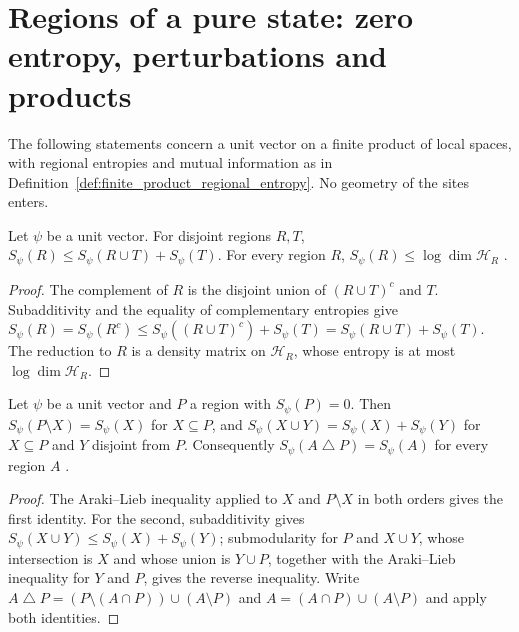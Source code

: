 \section{Regions of a pure state: zero entropy, perturbations and products}

The following statements concern a unit vector on a finite product of local
spaces, with regional entropies and mutual information as in
Definition~\ref{def:finite_product_regional_entropy}. No geometry of the sites
enters.

\begin{theorem}
    \label{thm:finite_product_araki_lieb}
    \leanok
    Let $\psi$ be a unit vector. For disjoint regions $R,T$,
    $S_\psi(R)\le S_\psi(R\cup T)+S_\psi(T)$. For every region $R$,
    $S_\psi(R)\le\log\dim\mathcal H_R$
    \cite[Section~2]{OpenAI2026AreaLaw}.
\end{theorem}
\begin{proof}\leanok
    The complement of $R$ is the disjoint union of $(R\cup T)^c$ and $T$.
    Subadditivity and the equality of complementary entropies give
    $S_\psi(R)=S_\psi(R^c)\le S_\psi((R\cup T)^c)+S_\psi(T)
    =S_\psi(R\cup T)+S_\psi(T)$. The reduction to $R$ is a density matrix on
    $\mathcal H_R$, whose entropy is at most $\log\dim\mathcal H_R$.
\end{proof}

\begin{theorem}
    \label{thm:finite_product_zero_entropy_region}
    \leanok
    Let $\psi$ be a unit vector and $P$ a region with $S_\psi(P)=0$. Then
    $S_\psi(P\setminus X)=S_\psi(X)$ for $X\subseteq P$, and
    $S_\psi(X\cup Y)=S_\psi(X)+S_\psi(Y)$ for $X\subseteq P$ and $Y$ disjoint
    from $P$. Consequently $S_\psi(A\mathbin{\triangle} P)=S_\psi(A)$ for every
    region $A$ \cite[proof of Theorem~1.1]{OpenAI2026AreaLaw}.
\end{theorem}
\begin{proof}\leanok
    The Araki--Lieb inequality applied to $X$ and $P\setminus X$ in both orders
    gives the first identity. For the second, subadditivity gives
    $S_\psi(X\cup Y)\le S_\psi(X)+S_\psi(Y)$; submodularity for $P$ and $X\cup Y$,
    whose intersection is $X$ and whose union is $Y\cup P$, together with the
    Araki--Lieb inequality for $Y$ and $P$, gives the reverse inequality. Write
    $A\mathbin{\triangle} P=(P\setminus(A\cap P))\cup(A\setminus P)$ and
    $A=(A\cap P)\cup(A\setminus P)$ and apply both identities.
\end{proof}

